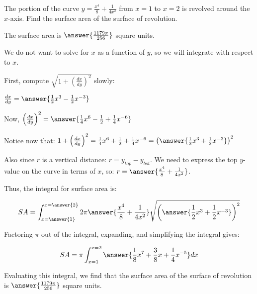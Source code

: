 \documentclass{ximera}
\author{Jim Talamo and Nicholas Hemleben}
\begin{document}
\begin{exercise}

The portion of the curve $y=\frac{x^4}{8} + \frac{1}{4x^2}$ from $x=1$ to $x=2$ is revolved around the $x$-axis.  Find the surface area of the surface of revolution.

The surface area is $\answer{ \frac {1179\pi }{256} }$ square units.

\begin{hint}
We do not want to solve for $x$ as a function of $y$, so we will integrate with respect to $x$.

\begin{question}
First, compute $\sqrt{1+\left(\frac{dx}{dy}\right)^2}$ slowly:

$\frac{dx}{dy} = \answer{\frac{1}{2}x^3 -\frac{1}{2} x^{-3}}$

\begin{question} 
Now, $\left(\frac{dx}{dy}\right)^2 = \answer{\frac{1}{4}x^6 - \frac{1}{2} + \frac{1}{4} x^{-6}}$

\begin{question}
Notice now that: 
$1+ \left(\frac{dx}{dy}\right)^2 = \frac{1}{4}x^6 + \frac{1}{2} + \frac{1}{4} x^{-6}=\left( \answer{ \frac {1}{2} x^3 + \frac{1}{2} x^{-3}}\right)^2$

\begin{question}
Also since $r$ is a vertical distance: $r=y_{top}-y_{bot}$.  We need to express the top $y$-value on the curve in terms of $x$, so: $r = \answer{\frac{x^4}{8} + \frac{1}{4x^2}}$.

\begin{question}
Thus, the integral for surface area is:

\[
SA = \int_{x=\answer{1}}^{x=\answer{2}} 2 \pi \answer{\frac{x^4}{8} + \frac{1}{4x^2}}\sqrt{\left(\answer{ \frac {1}{2} x^3 + \frac{1}{2} x^{-3}}\right)^2}
\]

\begin{question}
Factoring $\pi$ out of the integral, expanding, and simplifying the integral gives:

\[
SA= \pi \int_{x=1}^{x=2} \answer{\frac{1}{8} x^7 + \frac{3}{8} x + \frac{1}{4} x^{-5}} dx 
\]

\end{question}
\end{question}
\end{question}
\end{question}
\end{question} 
\end{question}

Evaluating this integral, we find that the surface area of the surface of revolution is $\answer{ \frac {1179\pi }{256}}$ square units. 
\end{hint}

\begin{exercise}




\end{exercise}
\end{exercise}
\end{document}
